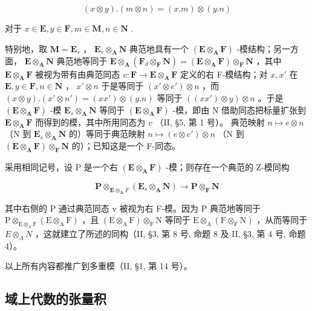 \[
(x \otimes y). (m \otimes n) = (x. m) \otimes (y. n)\tag{10}
\]

对于 \(x \in \mathbf{E}, y \in \mathbf{F}, m \in \mathbf{M}, n \in \mathbf{N}\) .

特别地，取 \(\mathbf{M} = \mathbf{E}_s\) ， \(\mathbf{E}_s \otimes_{\mathbf{A}} \mathbf{N}\) 典范地具有一个 \((\mathbf{E} \otimes_{\mathbf{A}} \mathbf{F})\) -模结构；另一方面， \(\mathbf{E} \otimes_{\mathbf{A}} \mathbf{N}\) 典范地等同于 \(\mathbf{E} \otimes_{\mathbf{A}} (\mathbf{F}_d \otimes_{\mathbf{F}} \mathbf{N}) = (\mathbf{E} \otimes_{\mathbf{A}} \mathbf{F}) \otimes_{\mathbf{F}} \mathbf{N}\) ，其中 \(\mathbf{E} \otimes_{\mathbf{A}} \mathbf{F}\) 被视为带有由典范同态 \(v: \mathbf{F} \to \mathbf{E} \otimes_{\mathbf{A}} \mathbf{F}\) 定义的右 F-模结构；对 \(x, x'\) 在 \(\mathbf{E}, y \in \mathbf{F}, n \in \mathbf{N}\) ， \(x' \otimes n\) 于是等同于 \((x' \otimes e') \otimes n\) ，而 \((x \otimes y).(x' \otimes n') = (xx') \otimes (y.n)\) 等同于 \(((xx') \otimes y) \otimes n\) 。于是 \((\mathbf{E} \otimes_{\mathbf{A}} \mathbf{F})\) -模 \(\mathbf{E}_s \otimes_{\mathbf{A}} \mathbf{N}\) 等同于 \((\mathbf{E} \otimes_{\mathbf{A}} \mathbf{F})\) -模，即由 N 借助同态把标量扩张到 \(\mathbf{E} \otimes_{\mathbf{A}} \mathbf{F}\) 而得到的模，其中所用同态为 \(v\) （II, §5, 第 1 号）。 典范映射 \(n \mapsto e \otimes n\) （N 到 \(\mathbf{E}_s \otimes_{\mathbf{A}} \mathbf{N}\) 的）等同于典范映射 \(n \mapsto (e \otimes e') \otimes n\) （N 到 \((\mathbf{E} \otimes_{\mathbf{A}} \mathbf{F}) \otimes_{\mathbf{F}} \mathbf{N}\) 的）；已知这是一个 F-同态。

采用相同记号，设 P 是一个右 \((\mathbf{E} \otimes_{\mathbf{A}} \mathbf{F})\) -模；则存在一个典范的 Z-模同构

\[
\mathbf {P} \otimes_ {\mathbf {E} \otimes_ {\mathbf {A}} F} (\mathbf {E} _ {s} \otimes_ {\mathbf {A}} \mathbf {N}) \rightarrow \mathbf {P} \otimes_ {\mathbf {F}} \mathbf {N}\tag{11}
\]

其中右侧的 P 通过典范同态 v 被视为右 F-模。因为 P 典范地等同于 \(\mathrm{P}\otimes_{\mathrm{E}\otimes_{\mathrm{A}}\mathrm{F}}(\mathrm{E}\otimes_{\mathrm{A}}\mathrm{F})\) ，且 \((\mathrm{E}\otimes_{\mathrm{A}}\mathrm{F})\otimes_{\mathrm{F}}\mathrm{N}\) 等同于 \(\mathrm{E}\otimes_{\mathrm{A}}(\mathrm{F}\otimes_{\mathrm{F}}\mathrm{N})\) ，从而等同于 \(E\otimes_{A}N\) ，这就建立了所述的同构（II, §3, 第 8 号, 命题 8 及 II, §3, 第 4 号, 命题 4）。

以上所有内容都推广到多重模（II, §1, 第 14 号）。

\subsection{域上代数的张量积}

